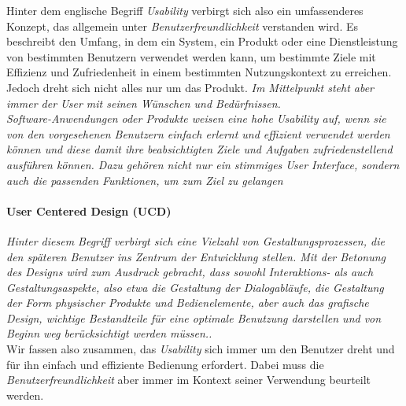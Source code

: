 Hinter dem englische Begriff \textit{Usability} verbirgt sich also ein umfassenderes Konzept, das allgemein unter \textit{Benutzerfreundlichkeit} verstanden wird. Es beschreibt den Umfang, in dem ein System, ein Produkt oder eine Dienstleistung von bestimmten Benutzern verwendet werden kann, um bestimmte Ziele mit Effizienz und Zufriedenheit in einem bestimmten Nutzungskontext zu erreichen. Jedoch dreht sich nicht alles nur um das Produkt. \textit{\glqq Im Mittelpunkt steht aber immer der User mit seinen Wünschen und Bedürfnissen.\grqq} \cite{von_gizycki_usability_2002}\\

\textit{\glqq Software-Anwendungen oder Produkte weisen eine hohe Usability auf, wenn sie von den vorgesehenen Benutzern einfach erlernt und effizient verwendet werden können und diese damit ihre beabsichtigten Ziele und Aufgaben zufriedenstellend ausführen können. Dazu gehören nicht nur ein stimmiges User Interface, sondern auch die passenden Funktionen, um zum Ziel zu gelangen\grqq} \cite{richter_usability_2016}\\

\paragraph{User Centered Design (UCD)}
\textit{\glqq Hinter diesem Begriff verbirgt sich eine Vielzahl von Gestaltungsprozessen, die den späteren Benutzer ins Zentrum der Entwicklung stellen. Mit der Betonung des Designs wird zum Ausdruck gebracht, dass sowohl Interaktions- als auch Gestaltungsaspekte, also etwa die Gestaltung der Dialogabläufe, die Gestaltung der Form physischer Produkte und Bedienelemente, aber auch das grafische Design, wichtige Bestandteile für eine optimale Benutzung darstellen und von Beginn weg berücksichtigt werden müssen..\grqq} \cite{richter_usability_2016}\\

Wir fassen also zusammen, das \textit{Usability} sich immer um den Benutzer dreht und für ihn einfach und effiziente Bedienung erfordert. Dabei muss die \textit{Benutzerfreundlichkeit} aber immer im Kontext seiner Verwendung beurteilt werden.
%
%
%
%
%
